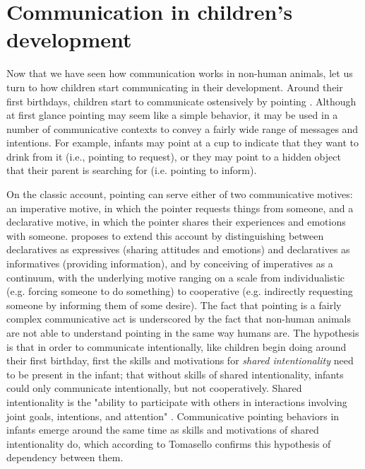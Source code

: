 \section{Communication in children's development}
\label{sec:comm:ontogeny}

Now that we have seen how communication works in non-human animals, let us turn to how children start communicating in their development.
Around their first birthdays, children start to communicate ostensively by pointing \citep{Tomasello08-origins}. Although at first glance pointing may seem like a simple behavior, it may be used in a number of communicative contexts to convey a fairly wide range of messages and intentions.
For example, infants may point at a cup to indicate that they want to drink from it (i.e., pointing to request), or they may point to a hidden object that their parent is searching for (i.e. pointing to inform).

On the classic account, pointing can serve either of two communicative motives: an imperative motive, in which the pointer requests things from someone, and a declarative motive, in which the pointer shares their experiences and emotions with someone.
\citet{Tomasello08-origins} proposes to extend this account by distinguishing between declaratives as expressives (sharing attitudes and emotions) and declaratives as informatives (providing information), and by conceiving of imperatives as a continuum, with the underlying motive ranging on a scale from individualistic (e.g. forcing someone to do something) to cooperative (e.g. indirectly requesting someone by informing them of some desire).
The fact that pointing is a fairly complex communicative act is underscored by the fact that non-human animals are not able to understand pointing in the same way humans are. 
The hypothesis is that in order to communicate intentionally, like children begin doing around their first birthday, first the skills and motivations for \emph{shared intentionality} need to be present in the infant; that without skills of shared intentionality, infants could only communicate intentionally, but not cooperatively.
Shared intentionality is the "ability to participate with others in interactions involving joint goals, intentions, and attention" \citep[p.~139]{Tomasello08-origins}. Communicative pointing behaviors in infants emerge around the same time as skills and motivations of shared intentionality do, which according to Tomasello confirms this hypothesis of dependency between them.

